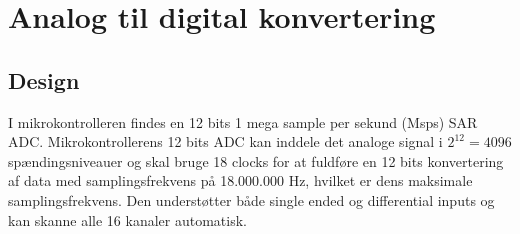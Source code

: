 \section{Analog til digital konvertering}
\subsection{Design}
I mikrokontrolleren findes en 12 bits 1 mega sample per sekund (Msps) SAR ADC. Mikrokontrollerens 12 bits ADC kan inddele det analoge signal i $2^{12} = 4096$ spændingsniveauer og skal bruge 18 clocks for at fuldføre en 12 bits konvertering af data med samplingsfrekvens på 18.000.000 Hz, hvilket er dens maksimale samplingsfrekvens. Den understøtter både single ended og differential inputs og kan skanne alle 16 kanaler automatisk. \citep{Semiconductor20164200M,Moore2004}